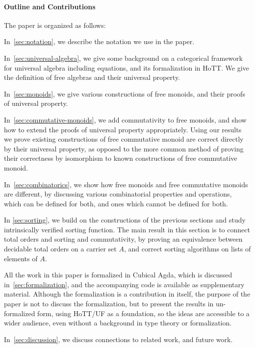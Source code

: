 \paragraph*{Outline and Contributions}
The paper is organized as follows:
\begin{myitemize}
  \item In~\cref{sec:notation}, we describe the notation we use in the paper.
  \item In~\cref{sec:universal-algebra}, we give some background on a categorical framework for universal algebra including equations, and its formalization in HoTT. We give the definition of free algebras and their universal property.
  \item In~\cref{sec:monoids}, we give various constructions of free monoids, and their proofs of universal property.
  \item In~\cref{sec:commutative-monoids}, we add commutativity to free monoids, and show how to extend the proofs of universal property appropriately. Using our results we prove existing constructions
        of free commutative monoid are correct directly by their universal property, as opposed to
        the more common method of proving their correctness by isomorphism to known constructions
        of free commutative monoid.
  \item In~\cref{sec:combinatorics}, we show how free monoids and free commutative monoids are different, by discussing various combinatorial properties and operations, which can be defined for both, and ones which cannot be defined for both.
  \item In \cref{sec:sorting}, we build on the constructions of the previous sections and study intrinsically verified sorting function. The main result in this section is to connect total orders and sorting and commutativity, by proving an equivalence between decidable total orders on a carrier set $A$, and correct sorting algorithms on lists of elements of $A$.
  \item All the work in this paper is formalized in Cubical Agda, which is discussed in~\cref{sec:formalization}, and the accompanying code is available as supplementary material. Although the formalization is a contribution in itself, the purpose of the paper is not to discuss the formalization, but to present the results in un-formalized form, using HoTT/UF as a foundation, so the ideas are accessible to a wider audience, even without a background in type theory or formalization.
  \item In~\cref{sec:discussion}, we discuss connections to related work, and future work.
\end{myitemize}
